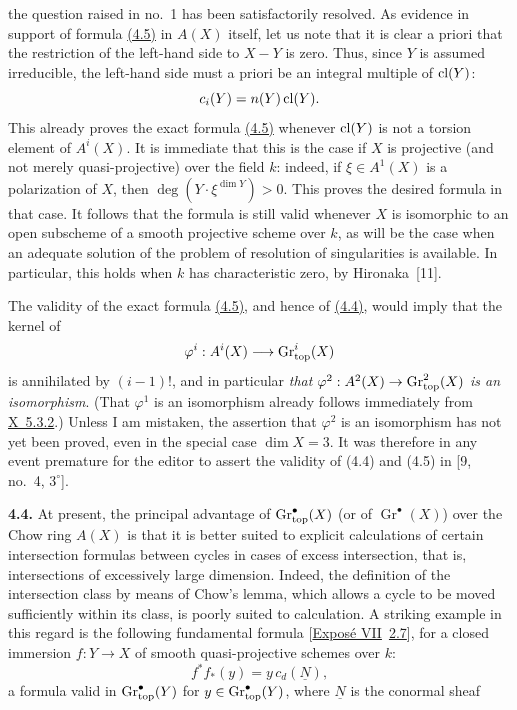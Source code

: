 the question raised in no.~1 has been satisfactorily resolved. As evidence
in support of formula \hyperlink{sga6.e14.eq.4-5}{(4.5)} in $A(X)$ itself, let us note that it is clear a
priori that the restriction of the left-hand side to $X-Y$ is zero. Thus,
since $Y$ is assumed irreducible, the left-hand side must a priori be an
integral multiple of $\operatorname{cl}(Y)$:
\[
 c_i(Y)=n(Y)\operatorname{cl}(Y).
\]
This already proves the exact formula \hyperlink{sga6.e14.eq.4-5}{(4.5)} whenever $\operatorname{cl}(Y)$ is not a
torsion element of $A^i(X)$. It is immediate that this is the case if $X$ is
projective (and not merely quasi-projective) over the field $k$: indeed, if
$\xi\in A^1(X)$ is a polarization of $X$, then
$\deg(Y\mathbin{\cdot}\xi^{\dim Y})>0$. This proves the desired formula in that
case. It follows that the formula is still valid whenever $X$ is isomorphic
to an open subscheme of a smooth projective scheme over $k$, as will be the
case when an adequate solution of the problem of resolution of
singularities is available. In particular, this holds when $k$ has
characteristic zero, by Hironaka~[11].

The validity of the exact formula \hyperlink{sga6.e14.eq.4-5}{(4.5)}, and hence of \hyperlink{sga6.e14.eq.4-4}{(4.4)}, would imply that
the kernel of
\[
 \varphi^i:A^i(X)\longrightarrow\operatorname{Gr}_{\mathrm{top}}^i(X)
\]
is annihilated by $(i-1)!$, and in particular \emph{that
$\varphi^2:A^2(X)\to\operatorname{Gr}_{\mathrm{top}}^2(X)$ is an isomorphism}. (That $\varphi^1$ is an
isomorphism already follows immediately from \hyperlink{sga6.e10.thm.5-3-2}{X~5.3.2}.) Unless I am
mistaken, the assertion that $\varphi^2$ is an isomorphism has not yet been
proved, even in the special case $\dim X=3$. It was therefore in any event
premature for the editor to assert the validity of (4.4) and (4.5) in
[9, no.~4, $3^\circ$].

\noindent{}\textbf{4.4.}
At present, the principal advantage of $\operatorname{Gr}_{\mathrm{top}}^\bullet(X)$ (or of
$\operatorname{Gr}^\bullet(X)$) over the Chow ring $A(X)$ is that it is
better suited to explicit calculations of certain intersection formulas
between cycles in cases of excess intersection, that is, intersections of
excessively large dimension. Indeed, the definition of the intersection
class by means of Chow's lemma, which allows a cycle to be moved sufficiently
within its class, is poorly suited to calculation. A striking example in
this regard is the following fundamental formula [\hyperlink{sga6.e07.expose}{Exposé VII}~\hyperlink{sga6.e07.para.2-6}{2.7}], for a
closed immersion $f:Y\to X$ of smooth quasi-projective schemes over $k$:
\begin{equation*}\tag{4.6}
 f^*f_*(y)=y\,c_d(\underline{N}),
\end{equation*}
a formula valid in $\operatorname{Gr}_{\mathrm{top}}^\bullet(Y)$ for $y\in\operatorname{Gr}_{\mathrm{top}}^\bullet(Y)$, where
$\underline{N}$ is the conormal sheaf

